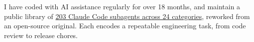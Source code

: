 \descript{ }
I have coded with AI assistance regularly for over 18 months, and maintain a public library of \href{https://github.com/laywill/awesome-claude-code-subagents}{203 Claude Code subagents across 24 categories}, reworked from an open-source original. Each encodes a repeatable engineering task, from code review to release chores.
\sectionsep{}
